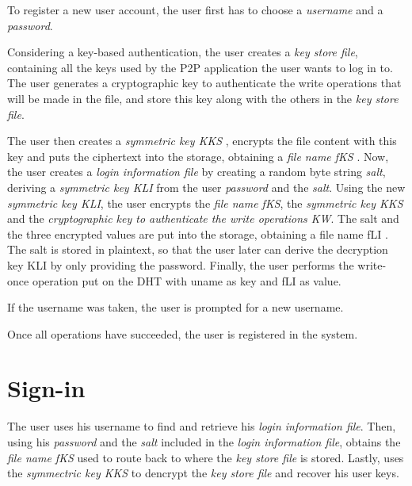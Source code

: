 To register a new user account, the user first
has to choose a \textit{username} and a \textit{password}.
% 
% 

Considering a key-based authentication, the user creates a \textit{key store file}, containing all the
keys used by the P2P application the user wants to log in to.
The user generates a cryptographic key to authenticate the write operations
that will be made in the file, and store this key along with the others in the
\textit{key store file}.


The user then creates a \textit{symmetric key KKS} ,
encrypts the file content with this key and puts the ciphertext
into the storage, obtaining a \textit{file name fKS} . Now, the user
creates a \textit{login information file} by creating a random
byte string \textit{salt}, deriving a \textit{symmetric key KLI} from the user
\textit{password} and the \textit{salt}.
Using the new \textit{ symmetric key KLI}, the user encrypts the \textit{file name fKS},
the \textit{symmetric key KKS} and the \textit{cryptographic key to
authenticate the write operations KW}.
 The salt and the three encrypted values are put
into the storage, obtaining a file name fLI . The salt is stored
in plaintext, so that the user later can derive the decryption
key KLI by only providing the password. Finally, the user
performs the write-once operation put on the DHT with
uname as key and fLI as value.

If the username was taken,
the user is prompted for a new username.

Once all operations
have succeeded, the user is registered in the system.


\section{Sign-in}
The user uses his username to find and retrieve his \textit{login information
file}. Then, using his \textit{password} and the \textit{salt} included in the
\textit{login information file}, obtains the \textit{file name fKS} used to
route back to where the \textit{key store file} is stored.  Lastly, uses the
\textit{symmectric key KKS} to dencrypt the \textit{key store file} and recover
his user keys.

